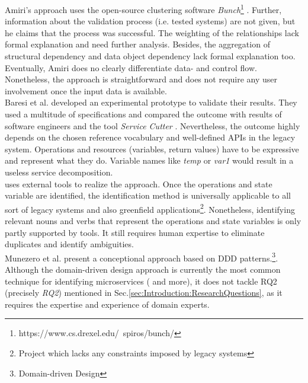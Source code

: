 Amiri's approach \cite{ObjectAwareAmiri} uses the open-source clustering software \textit{Bunch}\footnote{https://www.cs.drexel.edu/~spiros/bunch/} . Further, information about the validation process (i.e. tested systems) are not given, but he claims that the process was successful. The weighting of the relationships lack formal explanation and need further analysis. Besides, the aggregation of structural dependency and data object dependency lack formal explanation too. 
Eventually, Amiri does no clearly differentiate data- and control flow.
Nonetheless, the approach is straightforward and does not require any user involvement once the input data is available. \\

Baresi et al. \cite{interfaceAnalysisBaresi} developed an experimental prototype to validate their results. They used a multitude of specifications and compared the outcome  with results of software engineers and the tool \textit{Service Cutter} \cite{ServiceCutter}. Nevertheless, the outcome highly depends on the chosen reference vocabulary and  well-defined APIs in the legacy system. Operations and resources (variables, return values) have to be expressive and represent what they do. Variable names like \textit{temp} or \textit{var1} would result in a useless service decomposition. \\

\cite{FunctionalDecompositionHeinrich} uses external tools to realize the approach. Once the operations and state variable are identified, the identification method is universally applicable to all sort of legacy systems and also greenfield applications\footnote{Project which lacks any constraints imposed by legacy systems}. Nonetheless, identifying relevant nouns and verbs that represent the operations and state variables is only partly supported by tools. It still requires human expertise to eliminate duplicates and identify ambiguities. \\

Munezero et al. present a conceptional approach based on DDD patterns.\footnote{Domain-driven Design}. Although the domain-driven design approach is currently the most common technique for identifying microservices (\cite{FunctionalDecompositionHeinrich}\cite{Fowler}\cite{MigratingTowardsSurvey} and more), it does not tackle RQ2 (precisely \textit{RQ2}) mentioned in Sec.\ref{sec:Introduction:ResearchQuestions}, as it requires the expertise and experience of domain experts.\\

